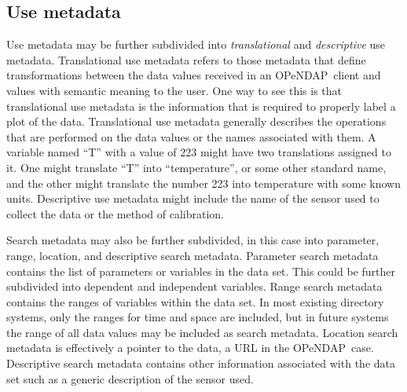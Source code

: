 \documentclass{codata}
\newcommand{\opendap}{\ac{OPeNDAP}}
\begin{document}

\subsection{Use metadata}

Use metadata may be further subdivided into \emph{translational} and
\emph{descriptive} use metadata.  Translational use metadata refers 
to those metadata that define transformations between the data values 
received in an \opendap\ client and values with semantic meaning to
the user. One way to see this is that translational use metadata
is the information that is required to properly label a plot of
the data. Translational use metadata generally describes the
operations that are performed on the data values or the names
associated with them.  A variable named ``T'' with a value of 223
might have two translations assigned to it.  One might translate
``T'' into ``temperature'', or some other standard name, and the 
other might translate the number 223 into temperature with some 
known units.
Descriptive use metadata might include the name of the sensor used to
collect the data or the method of calibration.  

Search metadata may also be further subdivided, in this case into
parameter, range, location, and descriptive search metadata. Parameter search
metadata contains the list of parameters or variables in the data
set. This could be further subdivided into dependent and independent
variables. Range search metadata contains the ranges of variables
within the data set. In most existing directory systems, only the
ranges for time and space are included, but in future systems the
range of all data values may be included as search metadata.
Location search metadata is effectively a pointer to the data, a
\ac{URL} in the \opendap\ case.
Descriptive search metadata
contains other information associated with the data set such as a
generic description of the sensor used. 
\end{document}
